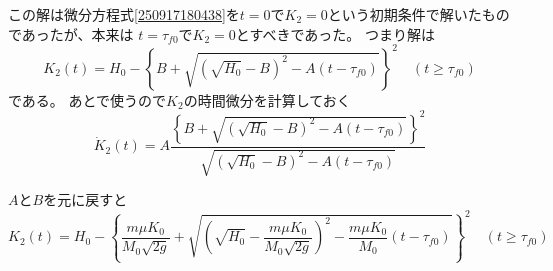 \documentclass[]{article}
\begin{document}
この解は微分方程式\eqref{250917180438}を$t=0$で$K_2=0$という初期条件で解いたものであったが、本来は
$t=\tau_{f0}$で$K_2=0$とすべきであった。
つまり解は
\begin{equation} \label{250917184208} 
   K_2(t) =  H_0 - \left\{
   				B + \sqrt{(\sqrt{H_0}-B)^2-A(t-\tau_{f0})}
   				\right\}^2  \quad (t\ge \tau_{f0})
\end{equation}
である。
あとで使うので$K_2$の時間微分を計算しておく
\begin{equation} \label{250917190039} 
  \dot{K}_2(t)  = A   
				\frac{\left\{
   				B + \sqrt{(\sqrt{H_0}-B)^2-A(t-\tau_{f0})}
   				\right\}^2}{\sqrt{(\sqrt{H_0}-B)^2-A(t-\tau_{f0})}}	
\end{equation}

$A$と$B$を元に戻すと 
\begin{equation} \label{250917184334} 
   K_2(t) =  H_0 - \left\{
   				\frac{m \mu K_0}{M_0\sqrt{2g}} + \sqrt{\left(\sqrt{H_0}-\frac{m \mu K_0}{M_0\sqrt{2g}}\right)^2-\frac{m \mu K_0}{M_0}(t-\tau_{f0})}
   				\right\}^2  \quad (t\ge \tau_{f0})
\end{equation}
\end{document}

